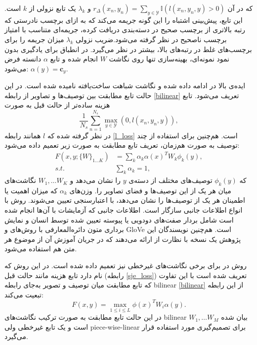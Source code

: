 که در آن
$ r_\Delta (x_n, y_n) =  \sum_{y \in \mathcal{Y}} \mathbb{I}(\mathit{l}(x_n, y_n, y)  > 0) $
 و $\lambda_k$ یک تابع نزولی از $k$ است. این تابع، پیش‌بینی اشتباه را  این گونه جریمه می‌کند که به ازای برچسب نادرستی که رتبه بالاتری از برچسب صحیح در دسته‌بندی دریافت کرده، جریمه‌ای متناسب با امتیاز برچسب ناصحیح در نظر گرفته می‌شود.ضریب نزولی $\lambda_k$ میزان جریمه را برای برچسب‌های غلط در رتبه‌های بالا، بیشتر در نظر می‌گیرد. در انطباق برای یادگیری بدون نمود نمونه‌ای، بهینه‌سازی تنها روی نگاشت $W$ انجام شده و  تابع $\alpha$ دانسته فرض می‌شود:
$\alpha(y) = \mathbf{c} _y$.


ایده‌ی بالا در \cite{Akata2015} ادامه داده شده و نگاشت شباهت ساخت‌یافته
نامیده شده است.
در این حالت تابع مطابقت بین توصیف‌ها و تصاویر از رابطه  \eqref{bilinear} تعریف می‌شود. تابع هزینه ساده‌تر از حالت قبل به صورت
\begin{equation} \label{sje_loss}
\frac{1}{N_s} \sum_{n=1}^{N_s} \max_{y \in \mathcal{Y}}(0, l(x_n, y_n, y)),
\end{equation}
در نظر گرفته شده که $l$ همانند رابطه \eqref{l_loss} است. هم‌چنین برای استفاده از چند توصیف به صورت هم‌زمان، تعریف تابع مطابقت به صورت زیر تعمیم داده می‌شود:
\begin{align}
F(x,y;\{W\}_{1\ldots K}) &= \sum_k \alpha_k \alpha(x)^T W_k \phi_k(y),  \\
s.t. & \sum_k \alpha_k = 1, \nonumber
\end{align}
که $\phi_k(y)$ توصیف‌های مختلف از دسته‌ی $y$ را نشان می‌دهد و $W_1, \ldots W_K$ نگاشت‌های میان هر یک از این توصیف‌ها و فضای تصاویر را. وزن‌های $\alpha_k$ که میزان اهمیت یا اطمینان  هر یک از توصیف‌ها را نشان می‌دهد، با اعتبارسنجی تعیین می‌شوند. روش  با انواع اطلاعات جانبی سازگار است. اطلاعات جانبی که آزمایشات با آن‌ها انجام شده است شامل بردار صفت‌های دودویی یا پیوسته تعیین شده توسط انسان و نمایش برداری متون دائره‌المعارفی با روش‌های  \cite{word2vec} و GloVe
\cite{pennington2014glove}
است. هم‌چنین نویسندگان این پژوهش یک نسخه با نظارت از  ارائه می‌دهند که در جریان آموزش آن از موضوع هر متن هم استفاده می‌شود.

 روش  در \cite{Xian2016} برای برخی نگاشت‌های غیرخطی نیز تعمیم داده شده است. در این روش  که
 نام دارد تابع هزینه مانند حالت قبل (رابطه \eqref{sje_loss}) تعریف شده است با این تفاوت که تابع مطابقت میان توصیف و تصویر به‌جای رابطه \gls{bilinear} \eqref{bilinear} از این رابطه تبعیت می‌کند:
 \begin{equation} \label{latem}
 F(x,y) = \max_{1\leq i \leq L} \phi(x)^TW_i \alpha(y).
 \end{equation}
در این حالت تابع مطابقت به صورت ترکیب نگاشت‌های \gls{bilinear} $W_1, \ldots W_M$ بیان شده است و یک تابع غیرخطی ولی \gls{piece-wise-linear}  برای تصمیم‌گیری مورد استفاده قرار می‌گیرد.

